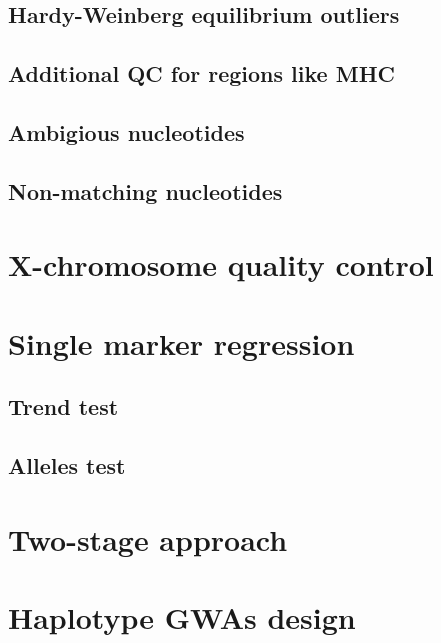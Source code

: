 \documentclass[]{book}
\theoremstyle{definition}
\theoremstyle{definition}
\theoremstyle{definition}
\theoremstyle{remark}
\begin{document}
\subsection{Hardy-Weinberg equilibrium
outliers}\label{hardy-weinberg-equilibrium-outliers}

\subsection{Additional QC for regions like
MHC}\label{additional-qc-for-regions-like-mhc}

\subsection{Ambigious nucleotides}\label{ambigious-nucleotides}

\subsection{Non-matching nucleotides}\label{non-matching-nucleotides}

\section{X-chromosome quality
control}\label{x-chromosome-quality-control}

\section{Single marker regression}\label{single-marker-regression}

\subsection{Trend test}\label{trend-test}

\subsection{Alleles test}\label{alleles-test}

\section{Two-stage approach}\label{two-stage-approach}

\section{Haplotype GWAs design}\label{haplotype-gwas-design}
\end{document}
